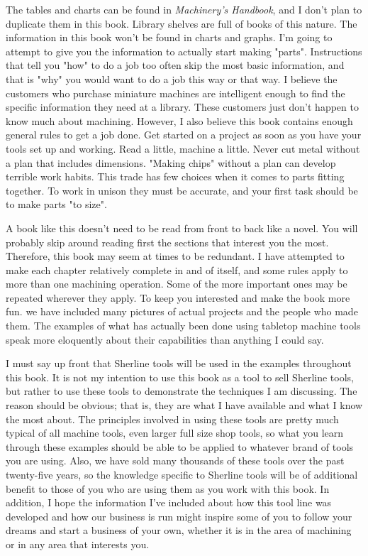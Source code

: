 The tables and charts can be found in \textit{Machinery's Handbook}, and I don't
plan to duplicate them in this book. Library shelves are full of books of this
nature. The information in this book won't be found in charts and graphs. I'm
going to attempt to give you the information to actually start making "parts".
Instructions that tell you "how" to do a job too often skip the most basic
information, and that is "why" you would want to do a job this way or that way.
I believe the customers who purchase miniature machines are intelligent enough
to find the specific information they need at a library. These customers just
don't happen to know much about machining. However, I also believe this book
contains enough general rules to get a job done. Get started on a project as
soon as you have your tools set up and working. Read a little, machine a little.
Never cut metal without a plan that includes dimensions. "Making chips" without
a plan can develop terrible work habits. This trade has few choices when it
comes to parts fitting together. To work in unison they must be accurate, and
your first task should be to make parts "to size".


A book like this doesn't need to be read from front to back like a novel. You
will probably skip around reading first the sections that interest you the most.
Therefore, this book may seem at times to be redundant. I have attempted to make
each chapter relatively complete in and of itself, and some rules apply to more
than one machining operation. Some of the more important ones may be repeated
wherever they apply. To keep you interested and make the book more fun. we have
included many pictures of actual projects and the people who made them. The
examples of what has actually been done using tabletop machine tools speak more
eloquently about their capabilities than anything I could say.


I must say up front that Sherline tools will be used in the examples throughout
this book. It is not my intention to use this book as a tool to sell Sherline
tools, but rather to use these tools to demonstrate the techniques I am
discussing. The reason should be obvious; that is, they are what I have
available and what I know the most about. The principles involved in using these
tools are pretty much typical of all machine tools, even larger full size shop
tools, so what you learn through these examples should be able to be applied to
whatever brand of tools you are using. Also, we have sold many thousands of
these tools over the past twenty-five years, so the knowledge specific to
Sherline tools will be of additional benefit to those of you who are using them
as you work with this book. In addition, I hope the information I've included
about how this tool line was developed and how our business is run might inspire
some of you to follow your dreams and start a business of your own, whether it
is in the area of machining or in any area that interests you.

